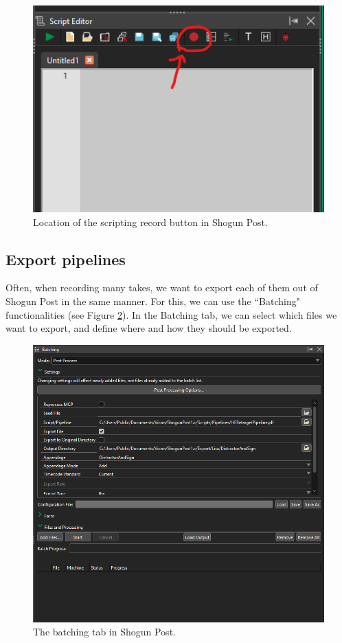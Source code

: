 \documentclass{uva-inf-article}
\begin{document}
\begin{figure}[hbt!]
    \centering
    \includegraphics[]{imgs/recordButton.png}
    \caption{Location of the scripting record button in Shogun Post.}
    \label{fig:recordButton}
\end{figure}


\subsection{Export pipelines}
Often, when recording many takes, we want to export each of them out of Shogun Post in the same manner. For this, we can use the ``Batching" functionalities (see Figure \ref{fig:batching}). In the Batching tab, we can select which files we want to export, and define where and how they should be exported. 
\begin{figure}[hbt!]
    \centering
    \includegraphics[width=\textwidth]{imgs/Batching.png}
    \caption{The batching tab in Shogun Post.}
    \label{fig:batching}
\end{figure}
\end{document}
